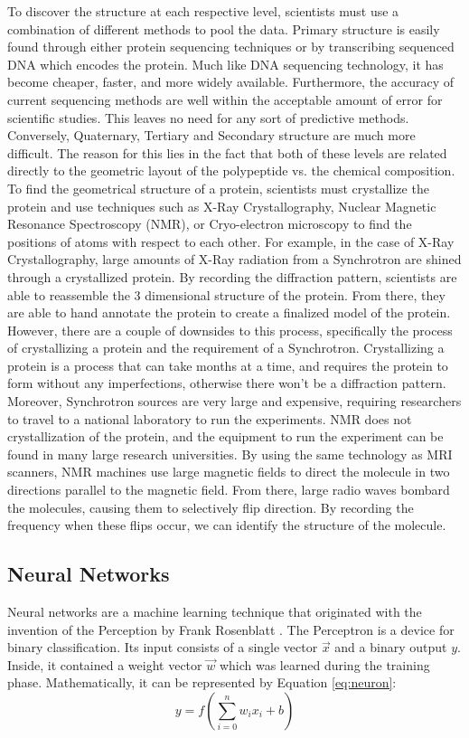 \documentclass[pageno]{jpaper}
\begin{document}
\par
To discover the structure at each respective level, scientists must use a combination of different methods to pool the data.  Primary structure is easily found through either protein sequencing techniques or by transcribing sequenced DNA which encodes the protein.  Much like DNA sequencing technology, it has become cheaper, faster, and more widely available.  Furthermore, the accuracy of current sequencing methods are well within the acceptable amount of error for scientific studies.  This leaves no need for any sort of predictive methods.  Conversely, Quaternary, Tertiary and Secondary structure are much more difficult.  The reason for this lies in the fact that both of these levels are related directly to the geometric layout of the polypeptide vs. the chemical composition.  To find the geometrical structure of a protein, scientists must crystallize the protein and use techniques such as X-Ray Crystallography, Nuclear Magnetic Resonance Spectroscopy (NMR), or Cryo-electron microscopy to find the positions of atoms with respect to each other.  For example, in the case of X-Ray Crystallography, large amounts of X-Ray radiation from a Synchrotron are shined through a crystallized protein.  By recording the diffraction pattern, scientists are able to reassemble the 3 dimensional structure of the protein.  From there, they are able to hand annotate the protein to create a finalized model of the protein.  However, there are a couple of downsides to this process, specifically the process of crystallizing a protein and the requirement of a Synchrotron.  Crystallizing a protein is a process that can take months at a time, and requires the protein to form without any imperfections, otherwise there won't be a diffraction pattern.  Moreover, Synchrotron sources are very large and expensive, requiring researchers to travel to a national laboratory to run the experiments.  NMR does not crystallization of the protein, and the equipment to run the experiment can be found in many large research universities.  By using the same technology as MRI scanners, NMR machines use large magnetic fields to direct the molecule in two directions parallel to the magnetic field.  From there, large radio waves bombard the molecules, causing them to selectively flip direction.  By recording the frequency when these flips occur, we can identify the structure of the molecule.

\subsection{Neural Networks}
Neural networks are a machine learning technique that originated with the invention of the Perception by Frank Rosenblatt \cite{rosenblatt:1958}.  The Perceptron is a device for binary classification.  Its input consists of a single vector $\vec{x}$ and a binary output $y$.  Inside, it contained a weight vector $\vec{w}$ which was learned during the training phase.  Mathematically, it can be represented by Equation \ref{eq:neuron}:
\begin{equation}
	\label{eq:neuron}
	y = f\left(\sum_{i = 0}^{n} w_{i}x_{i} + b\right)
\end{equation}
\end{document}
